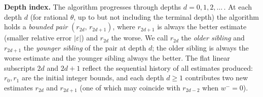 \documentclass[12pt]{article}
\theoremstyle{definition}
\theoremstyle{remark}
\theoremstyle{plain}
\newcommand{\eps}{\varepsilon}
\newcommand{\wminus}{w^{-}}
\begin{document}
\textbf{Depth index.}
The algorithm progresses through depths $d = 0, 1, 2, \ldots$\,.
At each depth $d$ (for rational $\theta$, up to but not including the
terminal depth) the algorithm holds a \emph{bounded pair}
$(r_{2d},\, r_{2d+1})$, where $r_{2d+1}$ is always the better estimate
(smaller relative error $|\eps|$) and $r_{2d}$ the worse.
We call $r_{2d}$ the \emph{older sibling} and $r_{2d+1}$ the \emph{younger
sibling} of the pair at depth $d$; the older sibling is always the worse
estimate and the younger sibling always the better.
The flat linear subscripts $2d$ and $2d+1$ reflect the sequential history
of all estimates produced: $r_0, r_1$ are the initial integer bounds, and
each depth $d \geq 1$ contributes two new estimates $r_{2d}$ and $r_{2d+1}$
(one of which may coincide with $r_{2d-2}$ when $\wminus = 0$).
\end{document}

